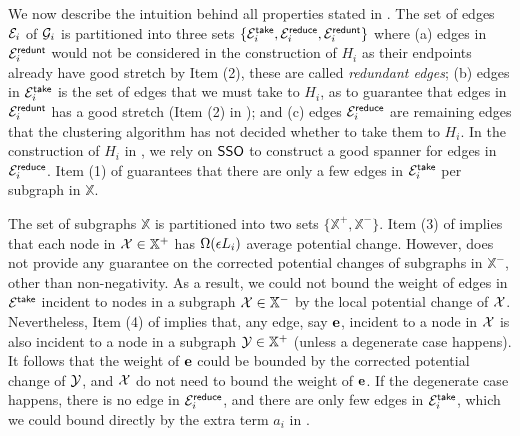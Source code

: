 We now describe the intuition behind all properties stated in . The set of edges $\mathcal{E}_i$ of $\mathcal{G}_i$ is partitioned into three sets $\{\mathcal{E}_i^{\mathsf{take}}, \mathcal{E}_i^{\mathsf{reduce}}, \mathcal{E}_i^{\mathsf{redunt}}\}$ where  (a) edges in $\mathcal{E}_i^{\mathsf{redunt}}$ would not be considered in the construction of $H_i$ as their endpoints already have good stretch by Item (2), these are called \emph{redundant edges}; (b) edges in   $\mathcal{E}_i^{\mathsf{take}}$ is the set of edges that we must take to $H_i$, as to guarantee that edges in $\mathcal{E}_i^{\mathsf{redunt}}$ has a good stretch (Item (2) in ); and (c) edges $\mathcal{E}_i^{\mathsf{reduce}}$ are remaining edges that the clustering algorithm has not decided whether to take them to $H_i$. In the construction of $H_i$ in , we rely on  \hyperlink{SPHigh}{$\mathsf{SSO}$} to construct a good spanner for edges in $\mathcal{E}_i^{\mathsf{reduce}}$. Item (1) of  guarantees that there are only a few edges in $\mathcal{E}^{\mathsf{take}}_i$ per subgraph in $\mathbb{X}$.


The set of subgraphs $\mathbb{X}$ is partitioned into two sets  $\{\mathbb{X}^{+},\mathbb{X}^{-}\}$.  Item (3) of  implies that each node in $\mathcal{X} \in \mathbb{X}^{+}$ has $\Omega(\epsilon L_i)$ average potential change. However,  does not provide any guarantee on the corrected potential changes of subgraphs in $\mathbb{X}^{-}$, other than non-negativity. As a result, we could not bound the weight of edges in $\mathcal{E}^{\mathsf{take}}$ incident to nodes in a subgraph $\mathcal{X}\in \mathbb{X}^{-}$ by the local potential change of $\mathcal{X}$. Nevertheless, Item (4) of  implies that, any edge, say $\mathbf{e}$, incident to a node in  $\mathcal{X}$ is also incident to a node in a subgraph $\mathcal{Y} \in \mathbb{X}^{+}$ (unless a degenerate case happens). It follows that the weight of $\mathbf{e}$ could be bounded by the corrected potential change of $\mathcal{Y}$, and $\mathcal{X}$ do not need to bound the weight of $\mathbf{e}$. If the degenerate case happens, there is no edge in $\mathcal{E}_i^{\mathsf{reduce}}$, and there are only few  edges in $\mathcal{E}_i^{\mathsf{take}}$, which we could bound directly by the extra term $a_i$ in .  



